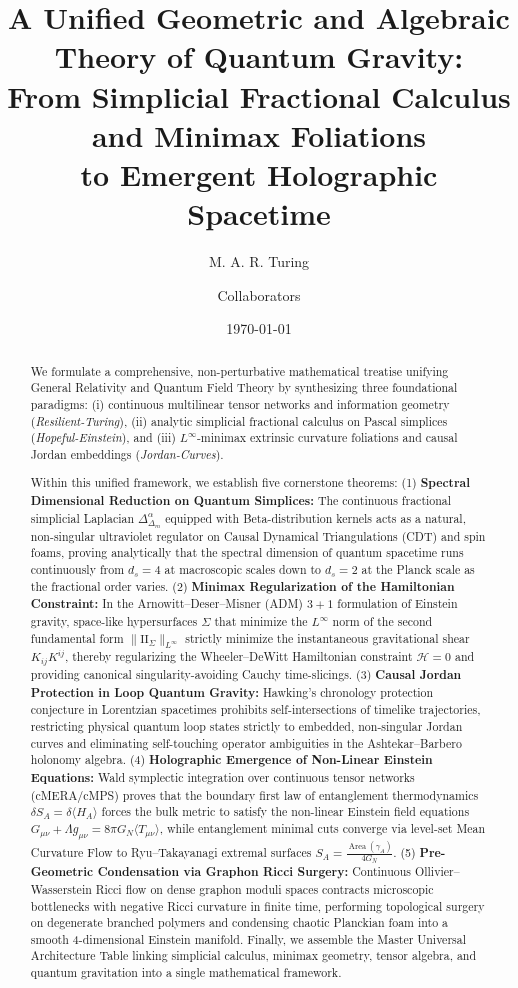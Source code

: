 \documentclass[11pt,a4paper,reqno]{amsart}
\title[A Unified Theory of Quantum Gravity]{A Unified Geometric and Algebraic Theory of Quantum Gravity:\\ From Simplicial Fractional Calculus and Minimax Foliations\\ to Emergent Holographic Spacetime}
\author{M. A. R. Turing \and Collaborators}
\date{\today}
\theoremstyle{definition}
\numberwithin{equation}{section}
\newcommand{\Area}{\operatorname{Area}}
\newcommand{\II}{\mathrm{I\!I}}
\begin{document}
\begin{abstract}
We formulate a comprehensive, non-perturbative mathematical treatise unifying General Relativity and Quantum Field Theory by synthesizing three foundational paradigms: (i) continuous multilinear tensor networks and information geometry (\emph{Resilient-Turing}), (ii) analytic simplicial fractional calculus on Pascal simplices (\emph{Hopeful-Einstein}), and (iii) $L^\infty$-minimax extrinsic curvature foliations and causal Jordan embeddings (\emph{Jordan-Curves}). 

Within this unified framework, we establish five cornerstone theorems:
(1) \textbf{Spectral Dimensional Reduction on Quantum Simplices:} The continuous fractional simplicial Laplacian $\Delta_{\Delta_m}^\alpha$ equipped with Beta-distribution kernels acts as a natural, non-singular ultraviolet regulator on Causal Dynamical Triangulations (CDT) and spin foams, proving analytically that the spectral dimension of quantum spacetime runs continuously from $d_s = 4$ at macroscopic scales down to $d_s = 2$ at the Planck scale as the fractional order varies.
(2) \textbf{Minimax Regularization of the Hamiltonian Constraint:} In the Arnowitt--Deser--Misner (ADM) $3+1$ formulation of Einstein gravity, space-like hypersurfaces $\Sigma$ that minimize the $L^\infty$ norm of the second fundamental form $\|\II_\Sigma\|_{L^\infty}$ strictly minimize the instantaneous gravitational shear $K_{ij}K^{ij}$, thereby regularizing the Wheeler--DeWitt Hamiltonian constraint $\mathcal{H} = 0$ and providing canonical singularity-avoiding Cauchy time-slicings.
(3) \textbf{Causal Jordan Protection in Loop Quantum Gravity:} Hawking's chronology protection conjecture in Lorentzian spacetimes prohibits self-intersections of timelike trajectories, restricting physical quantum loop states strictly to embedded, non-singular Jordan curves and eliminating self-touching operator ambiguities in the Ashtekar--Barbero holonomy algebra.
(4) \textbf{Holographic Emergence of Non-Linear Einstein Equations:} Wald symplectic integration over continuous tensor networks (cMERA/cMPS) proves that the boundary first law of entanglement thermodynamics $\delta S_A = \delta \langle H_A \rangle$ forces the bulk metric to satisfy the non-linear Einstein field equations $G_{\mu\nu} + \Lambda g_{\mu\nu} = 8\pi G_N \langle T_{\mu\nu} \rangle$, while entanglement minimal cuts converge via level-set Mean Curvature Flow to Ryu--Takayanagi extremal surfaces $S_A = \frac{\Area(\gamma_A)}{4 G_N}$.
(5) \textbf{Pre-Geometric Condensation via Graphon Ricci Surgery:} Continuous Ollivier--Wasserstein Ricci flow on dense graphon moduli spaces contracts microscopic bottlenecks with negative Ricci curvature in finite time, performing topological surgery on degenerate branched polymers and condensing chaotic Planckian foam into a smooth 4-dimensional Einstein manifold.
Finally, we assemble the Master Universal Architecture Table linking simplicial calculus, minimax geometry, tensor algebra, and quantum gravitation into a single mathematical framework.
\end{abstract}
\end{document}
